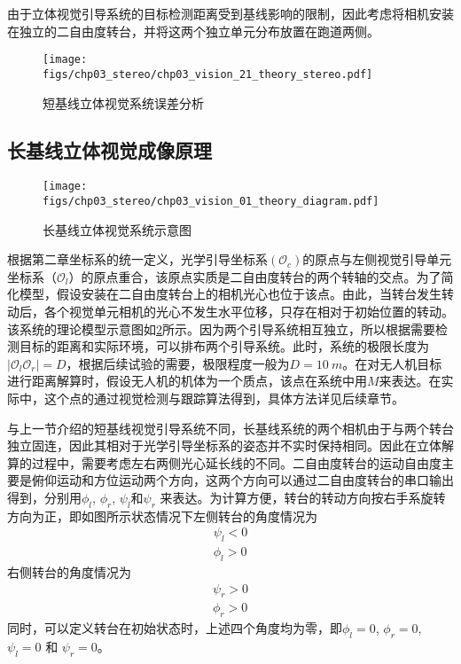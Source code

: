 由于立体视觉引导系统的目标检测距离受到基线影响的限制，因此考虑将相机安装在独立的二自由度转台，并将这两个独立单元分布放置在跑道两侧。

\begin{figure}[!tb]
	\centering
	\texttt{[image: figs/chp03\_stereo/chp03\_vision\_21\_theory\_stereo.pdf]}	
	\caption{短基线立体视觉系统误差分析}
	\label{fig:chp03_vision_21_theory_stereo}
\end{figure}


\subsection{长基线立体视觉成像原理}
\begin{figure}[!tb]
	\centering
	\texttt{[image: figs/chp03\_stereo/chp03\_vision\_01\_theory\_diagram.pdf]}	
	\caption{长基线立体视觉系统示意图}
	\label{fig:chp03_vision_01_theory_diagram}
\end{figure}

根据第二章坐标系的统一定义，光学引导坐标系$(\mathcal{O}_c)$的原点与左侧视觉引导单元坐标系（$\mathcal{O}_l$）的原点重合，该原点实质是二自由度转台的两个转轴的交点。为了简化模型，假设安装在二自由度转台上的相机光心也位于该点。由此，当转台发生转动后，各个视觉单元相机的光心不发生水平位移，只存在相对于初始位置的转动。该系统的理论模型示意图如\ref{fig:chp03_vision_01_theory_diagram}所示。因为两个引导系统相互独立，所以根据需要检测目标的距离和实际环境，可以排布两个引导系统。此时，系统的极限长度为$|\mathcal{O}_l\mathcal{O}_r| = D$，根据后续试验的需要，极限程度一般为$D = 10\ m$。在对无人机目标进行距离解算时，假设无人机的机体为一个质点，该点在系统中用$M$来表达。在实际中，这个点的通过视觉检测与跟踪算法得到，具体方法详见后续章节。

与上一节介绍的短基线视觉引导系统不同，长基线系统的两个相机由于与两个转台独立固连，因此其相对于光学引导坐标系的姿态并不实时保持相同。因此在立体解算的过程中，需要考虑左右两侧光心延长线的不同。二自由度转台的运动自由度主要是俯仰运动和方位运动两个方向，这两个方向可以通过二自由度转台的串口输出得到，分别用${\phi_l}$, ${\phi_r}$, ${\psi_l}$和${\psi_r}$ 来表达。为计算方便，转台的转动方向按右手系旋转方向为正，即如图所示状态情况下左侧转台的角度情况为
\begin{align}
\psi_l < 0 \\
\phi_l > 0
\end{align}
右侧转台的角度情况为
\begin{align}
\psi_r > 0 \\
\phi_r > 0
\end{align}
同时，可以定义转台在初始状态时，上述四个角度均为零，即$\phi_l= 0$, $\phi_r=0$, ${\psi_l=0}$ 和 ${\psi_r=0}$。


